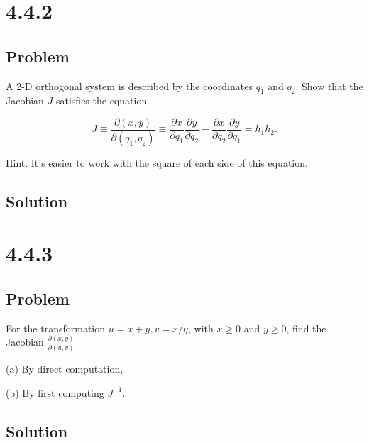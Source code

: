 \documentclass[12pt]{article}
\begin{document}
\newpage
\section{4.4.2}

\subsection{Problem}

A 2-D orthogonal system is described by the coordinates \(q_{1}\) and \(q_{2}\). Show that the Jacobian \(J\) satisfies the equation

\[
J \equiv \frac{\partial(x, y)}{\partial\left(q_{1}, q_{2}\right)} \equiv \frac{\partial x}{\partial q_{1}} \frac{\partial y}{\partial q_{2}}-\frac{\partial x}{\partial q_{2}} \frac{\partial y}{\partial q_{1}}=h_{1} h_{2} .
\]

Hint. It's easier to work with the square of each side of this equation.

\subsection{Solution}

\newpage
\section{4.4.3}

\subsection{Problem}

For the transformation \(u=x+y, v=x / y\), with \(x \geq 0\) and \(y \geq 0\), find the Jacobian \(\frac{\partial(x, y)}{\partial(u, v)}\)

(a) By direct computation,

(b) By first computing \(J^{-1}\).

\subsection{Solution}

\newpage


\nocite{El-Deeb_PEU-356_Assignments}
\end{document}
